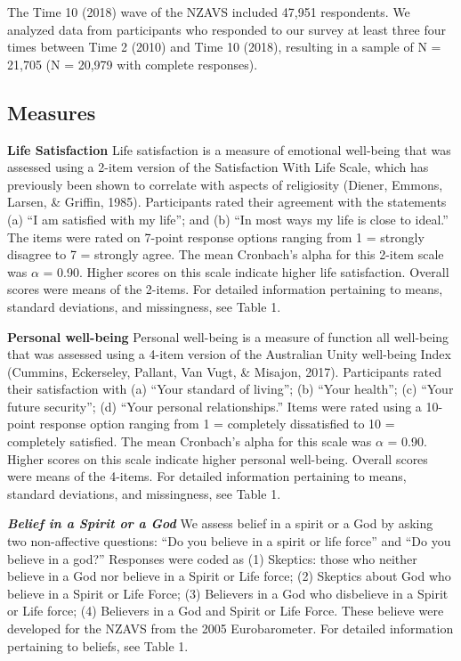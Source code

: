 \documentclass[
  english,
  man]{apa6}
\begin{document}
The Time 10 (2018) wave of the NZAVS included 47,951 respondents. We analyzed data from participants who responded to our survey at least three four times between Time 2 (2010) and Time 10 (2018), resulting in a sample of N = 21,705 (N = 20,979 with complete responses).

\hypertarget{measures}{%
\subsection{Measures}\label{measures}}

\textbf{Life Satisfaction} Life satisfaction is a measure of emotional well-being that was assessed using a 2-item version of the Satisfaction With Life Scale, which has previously been shown to correlate with aspects of religiosity (Diener, Emmons, Larsen, \& Griffin, 1985). Participants rated their agreement with the statements (a) \enquote{I am satisfied with my life}; and (b) \enquote{In most ways my life is close to ideal.} The items were rated on 7-point response options ranging from 1 = strongly disagree to 7 = strongly agree. The mean Cronbach's alpha for this 2-item scale was \(\alpha\) = 0.90. Higher scores on this scale indicate higher life satisfaction. Overall scores were means of the 2-items. For detailed information pertaining to means, standard deviations, and missingness, see Table 1.

\textbf{Personal well-being} Personal well-being is a measure of function all well-being that was assessed using a 4-item version of the Australian Unity well-being Index (Cummins, Eckerseley, Pallant, Van Vugt, \& Misajon, 2017). Participants rated their satisfaction with (a) \enquote{Your standard of living}; (b) \enquote{Your health}; (c) \enquote{Your future security}; (d) \enquote{Your personal relationships.} Items were rated using a 10-point response option ranging from 1 = completely dissatisfied to 10 = completely satisfied. The mean Cronbach's alpha for this scale was \(\alpha\) = 0.90. Higher scores on this scale indicate higher personal well-being. Overall scores were means of the 4-items. For detailed information pertaining to means, standard deviations, and missingness, see Table 1.

\textbf{\emph{Belief in a Spirit or a God}} We assess belief in a spirit or a God by asking two non-affective questions: \enquote{Do you believe in a spirit or life force} and \enquote{Do you believe in a god?} Responses were coded as (1) Skeptics: those who neither believe in a God nor believe in a Spirit or Life force; (2) Skeptics about God who believe in a Spirit or Life Force; (3) Believers in a God who disbelieve in a Spirit or Life force; (4) Believers in a God and Spirit or Life Force. These believe were developed for the NZAVS from the 2005 Eurobarometer. For detailed information pertaining to beliefs, see Table 1.
\end{document}
